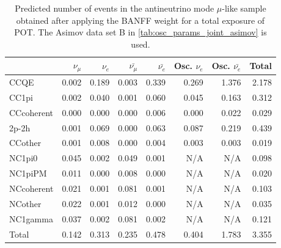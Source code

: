 
\begin{table}
\center
\begin{tabular} { | l ||r | r | r | r | r | r | | r | }
\hline
              & $\nu_\mu$            & $\nu_e$              & $\bar{\nu_\mu}$      & $\bar{\nu_e}$        & Osc. $\nu_e$         & Osc. $\bar{\nu_e}$   & Total                \\ \hline\hline
 CCQE         & 0.002                & 0.189                & 0.003                & 0.339                & 0.269                & 1.376                & 2.178                \\ \hline
 CC1pi        & 0.002                & 0.040                & 0.001                & 0.060                & 0.045                & 0.163                & 0.312                \\ \hline
 CCcoherent   & 0.000                & 0.000                & 0.000                & 0.006                & 0.000                & 0.022                & 0.029                \\ \hline
 2p-2h          & 0.001                & 0.069                & 0.000                & 0.063                & 0.087                & 0.219                & 0.439                \\ \hline
 CCother      & 0.001                & 0.008                & 0.000                & 0.004                & 0.003                & 0.003                & 0.019                \\ \hline
 NC1pi0       & 0.045                & 0.002                & 0.049                & 0.001                & N/A                  & N/A                  & 0.098                \\ \hline
 NC1piPM      & 0.011                & 0.000                & 0.008                & 0.000                & N/A                  & N/A                  & 0.020                \\ \hline
 NCcoherent   & 0.021                & 0.001                & 0.081                & 0.001                & N/A                  & N/A                  & 0.103                \\ \hline
 NCother      & 0.022                & 0.001                & 0.012                & 0.000                & N/A                  & N/A                  & 0.035                \\ \hline
 NC1gamma     & 0.037                & 0.002                & 0.081                & 0.002                & N/A                  & N/A                  & 0.121                \\ \hline
\hline
 Total        & 0.142                & 0.313                & 0.235                & 0.478                & 0.404                & 1.783                & 3.355                \\ \hline

\end{tabular}
\caption{
Predicted number of events in the antineutrino mode $\mu$-like sample
obtained after applying the BANFF weight
for a total exposure of \TotalPotNuBar{} POT.
The Asimov data set B in \cref{tab:osc_params_joint_asimov} is used.
}
\label{tab:events_rhc1re_Asimov_B}
\end{table}



